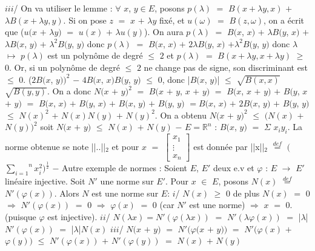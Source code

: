 \documentclass{article}
\begin{document}
$iii$/ On va utiliser le lemme : $\forall$ $x$, $y \in E$, posons $p(\lambda)$ $=$ $B(x + \lambda y, x)$ $+$ $\lambda B(x + \lambda y, y)$. Si on pose \smallbreak $z$ $=$ $x$ $+$ $\lambda y$ fixé, et $u(\omega)$ $=$ $B(z, \omega)$, on a écrit que ($u(x$ $+$ $\lambda y)$ $=$ $u(x)$ $+$ $\lambda u(y)$). \smallbreak On aura $p(\lambda)$ $=$ $B(x$, $x)$ $+$ $\lambda B(y$, $x)$ $+$ $\lambda B(x$, $y)$ $+$ $\lambda^2B(y$, $y)$ donc $p(\lambda)$ $=$ $B(x$, $x)$ $+$ $2\lambda B(y$, $x)$ $+$\smallbreak $\lambda^2B(y$, $y)$ donc $\lambda$ $\mapsto$ $p(\lambda)$ est un polynôme de degré $\leqslant$ $2$ et $p(\lambda)$ $=$ $B(x + \lambda y, x + \lambda y)$ $\geqslant$ $0$. \smallbreak Or, si un polynôme de degré $\leqslant$ $2$ ne change pas de signe, son discriminant est $\leqslant$ $0$. \smallbreak ($2B(x$, $y))^2$ $-$ $4B(x$, $x)B(y$, $y)$ $\leqslant$ $0$, donc |$B(x$, $y)$| $\leqslant$ $\sqrt{B(x, x)}$ $\sqrt{B(y, y)}$. On a donc $N(x$ $+$ $y)^2$ \smallbreak $=$ $B(x$  $+$ $y$, $x$  $+$ $y)$ $=$ $B(x$, $x$  $+$ $y)$ $+$ $B(y$, $x$  $+$ $y)$ $=$ $B(x$, $x)$ $+$ $B(y$, $x)$ $+$ $B(x$, $y)$ $+$ $B(y$, $y)$ $=$\smallbreak $B(x$, $x)$ $+$ $2B(x$, $y)$ $+$ $B(y$, $y)$ $\leqslant$ $N(x)^2$ $+$ $N(x)N(y)$ $+$ $N(y)^2$. \smallbreak On a obtenu $N(x$ $+$ $y)^2$ $\leqslant$ $(N(x)$ $+$ $N(y))^2$ soit $N(x$ $+$ $y)$ $\leqslant$ $N(x)$ $+$ $N(y)$
\parindent=1cm
\smallbreak
$-$ $E = \mathbb{R}^n$ : $B(x$, $y)$ $=$ $\Sigma$ $x_iy_i$. La norme obtenue se note ||..||$_2$ et pour $x$ $=$ 
$
\begin{bmatrix}
	x_1 \\
	\vdots \\
	x_n
\end{bmatrix}
$
 est donnée par \smallbreak ||x||$_2$ $\overset{ def }{=}$ $($ $\overset{n}{\underset{i = 1}{\sum}} x_i^2)^{\frac{1}{2}}$
\smallbreak
$-$ Autre exemple de normes : Soient $E$, $E'$ deux e.v et $\varphi$ : $E$ $\rightarrow$ $E'$ linéaire injective. \smallbreak Soit $N'$ une norme sur $E'$. Pour $x$ $\in$ $E$, posons $N(x)$ $\overset{ def }{=}$ $N'(\varphi (x))$. Alors $N$ est une norme sur $E$:
\smallbreak $i$/ $N(x)$ $\geqslant$ $0$ de plus $N(x)$ $=$ $0$ $\Longrightarrow$ $N'(\varphi(x))$ $=$ $0$ $\Longrightarrow$ $\varphi(x)$ $=$ $0$ (car $N'$ est une norme) $\Longrightarrow$ $x$ $=$ $0$. (puisque \smallbreak$\varphi$ est injective).
\smallbreak
$ii$/ $N(\lambda x) = N'(\varphi(\lambda x))$ $=$ $N'(\lambda \varphi(x))$ $=$ |$\lambda$|$N'(\varphi(x))$ $=$ |$\lambda$|$N(x)$
\smallbreak
$iii$/ $N(x$ $+$ $y)$ $=$ $N'(\varphi(x$ $+$ $y))$ $=$ $N'(\varphi(x)$ $+$ $\varphi(y))$ $\leqslant$ $N'(\varphi(x))$ $+$ $N'(\varphi(y))$ $=$ $N(x)$ $+$ $N(y)$
\parindent=0cm
\end{document}

